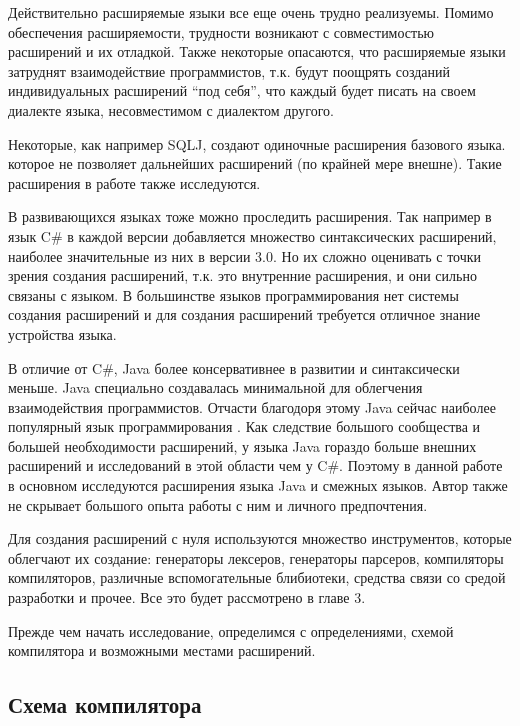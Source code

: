 \documentclass[a4paper,12pt]{article}
\begin{document}
Действительно расширяемые языки все еще очень трудно реализуемы.
Помимо обеспечения расширяемости, трудности возникают с совместимостью
расширений и их отладкой. Также некоторые опасаются, что расширяемые языки
затруднят взаимодействие программистов, т.к. будут поощрять созданий
индивидуальных расширений ``под себя'', что каждый будет писать на своем
диалекте языка, несовместимом с диалектом другого.

Некоторые, как например SQLJ, создают одиночные расширения базового языка. 
которое не позволяет дальнейших расширений (по крайней мере внешне). Такие
расширения в работе также исследуются.

В развивающихся языках тоже можно проследить расширения. Так например в язык C\#
в каждой версии добавляется множество синтаксических расширений, наиболее
значительные из них в версии 3.0. Но их сложно оценивать с точки зрения
создания расширений, т.к. это внутренние расширения, и они сильно связаны с
языком. В большинстве языков программирования нет системы создания расширений и
для создания расширений требуется отличное знание устройства языка.

В отличие от C\#, Java более консервативнее в развитии и синтаксически меньше.
Java специально создавалась минимальной для облегчения взаимодействия
программистов. Отчасти благодоря этому Java сейчас наиболее популярный язык
программирования \cite{tiobe}. Как следствие большого сообщества и большей
необходимости расширений, у языка Java гораздо больше внешних расширений и
исследований в этой области чем у C\#. Поэтому в данной работе в основном
исследуются расширения языка Java и смежных языков. Автор также не скрывает
большого опыта работы с ним и личного предпочтения.

Для создания расширений с нуля используются множество инструментов, которые
облегчают их создание: генераторы лексеров, генераторы парсеров, компиляторы
компиляторов, различные вспомогательные блибиотеки, средства связи со средой
разработки и прочее. Все это будет рассмотрено в главе 3.

Прежде чем начать исследование, определимся с определениями, схемой компилятора
и возможными местами расширений.

\subsection{Схема компилятора}
\end{document}
